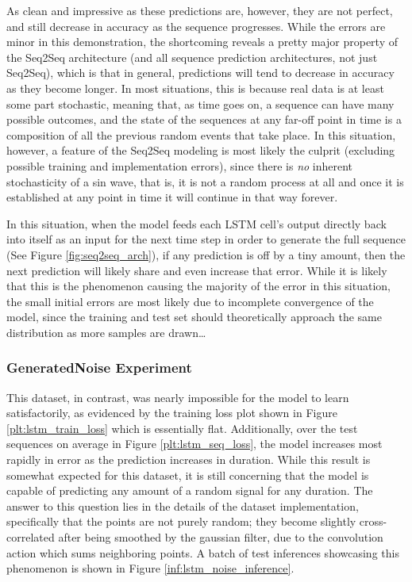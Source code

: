 \documentclass{scrartcl}
\begin{document}
As clean and impressive as these predictions are, however, they are not
perfect, and still decrease in accuracy as the sequence progresses. While the
errors are minor in this demonstration, the shortcoming reveals a pretty major
property of the Seq2Seq architecture (and all sequence prediction
architectures, not just Seq2Seq), which is that in general, predictions will
tend to decrease in accuracy as they become longer. In most situations, this is
because real data is at least some part stochastic, meaning that, as time goes
on, a sequence can have many possible outcomes, and the state of the sequences
at any far-off point in time is a composition of all the previous random events
that take place. In this situation, however, a feature of the Seq2Seq modeling
is most likely the culprit (excluding possible training and implementation
errors), since there is \textit{no} inherent stochasticity of a sin wave, that
is, it is not a random process at all and once it is established at any point
in time it will continue in that way forever. 

In this situation, when the model feeds each LSTM cell's output directly back
into itself as an input for the next time step in order to generate the full
sequence (See Figure \ref{fig:seq2seq_arch}), if any prediction is off by a
tiny amount, then the next prediction will likely share and even increase that
error. While it is likely that this is the phenomenon causing the majority of
the error in this situation, the small initial errors are most likely due to
incomplete convergence of the model, since the training and test set should
theoretically approach the same distribution as more samples are drawn\dots

\subsubsection{GeneratedNoise Experiment}
\label{subsubsec:generated_noise}

This dataset, in contrast, was nearly impossible for the model to learn
satisfactorily, as evidenced by the training loss plot shown in Figure
\ref{plt:lstm_train_loss} which is essentially flat. Additionally, over the
test sequences on average in Figure \ref{plt:lstm_seq_loss}, the model
increases most rapidly in error as the prediction increases in duration. While
this result is somewhat expected for this dataset, it is still concerning that
the model is capable of predicting any amount of a random signal for any
duration. The answer to this question lies in the details of the dataset
implementation, specifically that the points are not purely random; they become
slightly cross-correlated after being smoothed by the gaussian filter, due to
the convolution action which sums neighboring points. A batch of test
inferences showcasing this phenomenon is shown in Figure
\ref{inf:lstm_noise_inference}.
\end{document}
